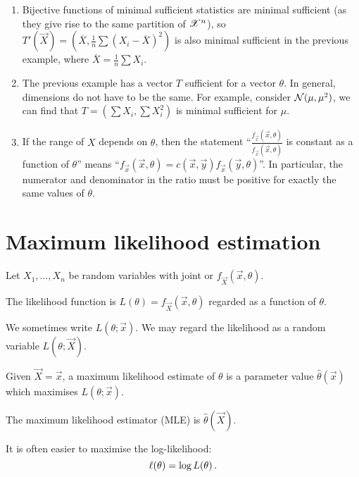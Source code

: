 \begin{enumerate}
\item Bijective functions of minimal sufficient statistics are minimal sufficient (as they give rise to the same partition of $\mathscr{X}^n$), so $T'(\vec{X}) = \left(\overline{X}, \frac{1}{n}\sum(X_i - \overline{X})^2\right)$ is also minimal sufficient in the previous example, where $\overline{X} = \frac{1}{n}\sum X_i$.
\item The previous example has a vector $T$ sufficient for a vector $\theta$. In general, dimensions do not have to be the same. For example, consider $\mathcal{N}(\mu, \mu^2)$, we can find that $T = \left(\sum X_i, \sum X_i^2\right)$ is minimal sufficient for $\mu$.
\item If the range of $X$ depends on $\theta$, then the statement ``$\frac{f_{\vec{x}}(\vec{x}, \theta)}{f_{\vec{x}}(\vec{x}, \theta)}$ is constant as a function of $\theta$'' means ``$f_{\vec{x}} (\vec{x}, \theta) = c(\vec{x}, \vec{y})f_{\vec{x}}(\vec{y}, \theta)$''. In particular, the numerator and denominator in the ratio must be positive for exactly the same values of $\theta$.
\end{enumerate}

\section{Maximum likelihood estimation}
Let $X_1, \dotsc, X_n$ be random variables with joint \pdf or \pmf $f_{\vec{X}}(\vec{x}, \theta)$.

\begin{definition}
  The likelihood function is $L(\theta) = f_{\vec{X}}(\vec{x}, \theta)$ regarded as a function of $\theta$.
\end{definition}

We sometimes write $L(\theta; \vec{x})$. We may regard the likelihood as a random variable $L(\theta; \vec{X})$.

\begin{definition}
  Given $\vec{X} = \vec{x}$, a maximum likelihood estimate of $\theta$ is a parameter value $\hat{\theta}(\vec{x})$ which maximises $L(\theta; \vec{x})$.

  The maximum likelihood estimator (MLE) is $\hat{\theta}(\vec{X})$.
\end{definition}

It is often easier to maximise the log-likelihood:
\[
\ell(\theta) = \log L(\theta) \, {.}
\]

